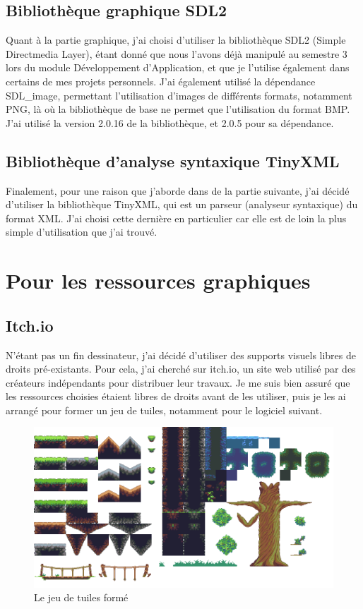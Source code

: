 \documentclass[12pt, openany]{report}
\begin{document}
\subsection{Biblioth\`eque graphique SDL2}
Quant \`a la partie graphique, j'ai choisi d'utiliser la biblioth\`eque SDL2 (Simple Directmedia Layer), \'etant donn\'e que nous l'avons d\'ej\`a manipul\'e au semestre 3 lors du module D\'eveloppement d'Application, et que je l'utilise \'egalement dans certains de mes projets personnels. J'ai \'egalement utilis\'e la d\'ependance SDL\_image, permettant l'utilisation d'images de diff\'erents formats, notamment PNG, l\`a o\`u la biblioth\`eque de base ne permet que l'utilisation du format BMP.
\\
J'ai utilis\'e la version 2.0.16 de la biblioth\`eque, et 2.0.5 pour sa d\'ependance.

\subsection{Biblioth\`eque  d'analyse syntaxique TinyXML}
Finalement, pour une raison que j'aborde dans de la partie suivante, j'ai d\'ecid\'e d'utiliser la biblioth\`eque TinyXML, qui est un parseur (analyseur syntaxique) du format XML. J'ai choisi cette derni\`ere en particulier car elle est de loin la plus simple d'utilisation que j'ai trouv\'e.
\vfill
\section{Pour les ressources graphiques}
\subsection{Itch.io}
N'\'etant pas un fin dessinateur, j'ai d\'ecid\'e d'utiliser des supports visuels libres de droits pr\'e-existants. Pour cela, j'ai cherch\'e sur itch.io, un site web utilis\'e par des cr\'eateurs ind\'ependants pour distribuer leur travaux. Je me suis bien assur\'e que les ressources choisies \'etaient libres de droits avant de les utiliser, puis je les ai arrang\'e pour former un jeu de tuiles, notamment pour le logiciel suivant.
\begin{figure}[!h]
\centering
\includegraphics[scale=0.3]{Jungle_terrain.png}
\caption{Le jeu de tuiles form\'e}
\end{figure}
\end{document}
